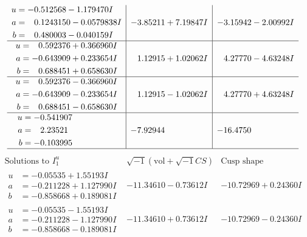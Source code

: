 \documentclass[1p]{elsarticle_modified}
\theoremstyle{definition}
\newcommand{\I}{\sqrt{-1}}
\begin{document}
$$\begin{array}{c|c|c}
\begin{aligned}
u &= -0.512568 - 1.179470 I \\
a &= \phantom{-}0.1243150 - 0.0579838 I \\
b &= \phantom{-}0.480003 - 0.040159 I\end{aligned}
 & -3.85211 + 7.19847 I & -3.15942 - 2.00992 I \\ \hline\begin{aligned}
u &= \phantom{-}0.592376 + 0.366960 I \\
a &= -0.643909 + 0.233654 I \\
b &= \phantom{-}0.688451 + 0.658630 I\end{aligned}
 & \phantom{-}1.12915 + 1.02062 I & \phantom{-}4.27770 - 4.63248 I \\ \hline\begin{aligned}
u &= \phantom{-}0.592376 - 0.366960 I \\
a &= -0.643909 - 0.233654 I \\
b &= \phantom{-}0.688451 - 0.658630 I\end{aligned}
 & \phantom{-}1.12915 - 1.02062 I & \phantom{-}4.27770 + 4.63248 I \\ \hline\begin{aligned}
u &= -0.541907\phantom{ +0.000000I} \\
a &= \phantom{-}2.23521\phantom{ +0.000000I} \\
b &= -0.103995\phantom{ +0.000000I}\end{aligned}
 & -7.92944\phantom{ +0.000000I} & -16.4750\phantom{ +0.000000I}\\
 \hline 
 \end{array}$$\newpage$$\begin{array}{c|c|c}  
\text{Solutions to }I^u_{1}& \I (\text{vol} + \sqrt{-1}CS) & \text{Cusp shape}\\
 \hline 
\begin{aligned}
u &= -0.05535 + 1.55193 I \\
a &= -0.211228 + 1.127990 I \\
b &= -0.858668 + 0.189081 I\end{aligned}
 & -11.34610 - 0.73612 I & -10.72969 + 0.24360 I \\ \hline\begin{aligned}
u &= -0.05535 - 1.55193 I \\
a &= -0.211228 - 1.127990 I \\
b &= -0.858668 - 0.189081 I\end{aligned}
 & -11.34610 + 0.73612 I & -10.72969 - 0.24360 I \\ \hline\begin{aligned}

\end{aligned}
\end{array}$$
\end{document}
